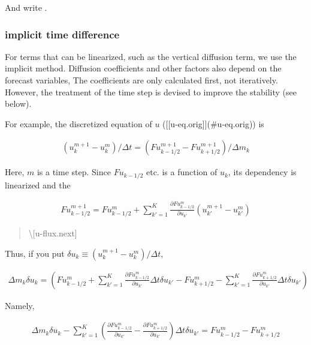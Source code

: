 And write .

\hypertarget{implicit-time-difference}{%
\subsubsection{implicit time
difference}\label{implicit-time-difference}}

For terms that can be linearized, such as the vertical diffusion term,
we use the implicit method. Diffusion coefficients and other factors
also depend on the forecast variables, The coefficients are only
calculated first, not iteratively. However, the treatment of the time
step is devised to improve the stability (see below).

For example, the discretized equation of \(u\)
({[}{[}u-eq.orig{]}{]}(\#u-eq.orig)) is

\begin{eqnarray}
  (u_k^{m+1} - u_k^{m})/\Delta t 
    = (Fu^{m+1}_{k-1/2}-Fu^{m+1}_{k+1/2})/\Delta m_k
\end{eqnarray}

Here, \(m\) is a time step. Since \(Fu_{k-1/2}\) etc. is a function of
\(u_k\), its dependency is linearized and the

\begin{eqnarray}
   Fu^{m+1}_{k-1/2} 
  =  Fu^{m}_{k-1/2} 
  +  \sum_{k'=1}^{K} 
     \frac{\partial Fu^{m}_{k-1/2}}{\partial u_{k'}} (u^{m+1}_{k'}-u^{m}_{k'})
\end{eqnarray}

\begin{quote}
\protect\hypertarget{u-flux.next}{}{\textbackslash{[}u-flux.next{]}}
\end{quote}

Thus, if you put \(\delta u_k \equiv (u^{m+1}_{k}-u^{m}_{k})/\Delta t\),

\begin{eqnarray}
  \Delta m_k \delta u_k
  =   \left( Fu^{m}_{k-1/2}
         +  \sum_{k'=1}^{K} 
            \frac{\partial Fu^{m}_{k-1/2}}{\partial u_{k'}} \Delta t \delta u_{k'}
         -   Fu^{m}_{k+1/2}
         -  \sum_{k'=1}^{K}
            \frac{\partial Fu^{m}_{k+1/2}}{\partial u_{k'}} \Delta t \delta u_{k'}
      \right) 
\end{eqnarray}

Namely,

\begin{eqnarray}
  \Delta m_k \delta u_k
  -  \sum_{k'=1}^{K} \left(  \frac{\partial Fu^{m}_{k-1/2}}{\partial u_{k'}} 
                       - \frac{\partial Fu^{m}_{k+1/2}}{\partial u_{k'}} \right)
                 \Delta t\delta u_{k'}
  = Fu^{m}_{k-1/2} - Fu^{m}_{k+1/2}
\end{eqnarray}

